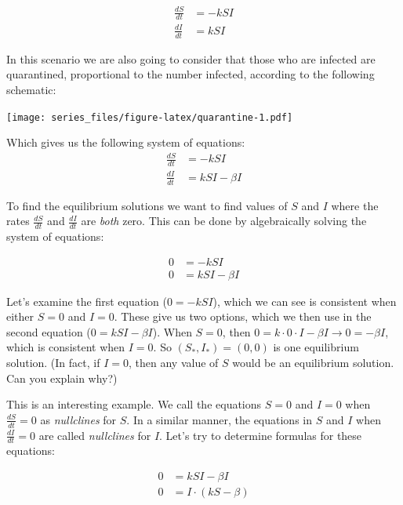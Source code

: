 \documentclass[
]{book}
\theoremstyle{definition}
\theoremstyle{definition}
\theoremstyle{definition}
\theoremstyle{remark}
\begin{document}
\begin{align*}
\frac{dS}{dt} &= -kSI \\
\frac{dI}{dt} &= kSI
\end{align*}

In this scenario we are also going to consider that those who are infected are quarantined, proportional to the number infected, according to the following schematic:

\texttt{[image: series\_files/figure-latex/quarantine-1.pdf]}

Which gives us the following system of equations:
\begin{equation}
\begin{split}\label{eq:flu-quarantine}
\frac{dS}{dt} &= -kSI \\
\frac{dI}{dt} &= kSI - \beta I
\end{split}
\end{equation}

To find the equilibrium solutions we want to find values of \(S\) and \(I\) where the rates \(\displaystyle \frac{dS}{dt}\) and \(\displaystyle \frac{dI}{dt}\) are \emph{both} zero. This can be done by algebraically solving the system of equations:

\begin{align*}
0 &= -kSI \\
0 &= kSI - \beta I
\end{align*}

Let's examine the first equation (\(0 = -kSI\)), which we can see is consistent when either \(S=0\) and \(I=0\). These give us two options, which we then use in the second equation (\(0 = kSI - \beta I\)). When \(S=0\), then \(0 = k\cdot 0 \cdot I - \beta I \rightarrow 0 = -\beta I\), which is consistent when \(I=0\). So \((S_{*},I_{*}) = (0,0)\) is one equilibrium solution. (In fact, if \(I=0\), then any value of \(S\) would be an equilibrium solution. Can you explain why?)

This is an interesting example. We call the equations \(S=0\) and \(I=0\) when \(\displaystyle \frac{dS}{dt}=0\) as \emph{nullclines} for \(S\). In a similar manner, the equations in \(S\) and \(I\) when \(\displaystyle \frac{dI}{dt}=0\) are called \emph{nullclines} for \(I\). Let's try to determine formulas for these equations:

\begin{align*}
0 &= kSI-\beta I \\
0 &= I\cdot (kS - \beta )
\end{align*}
\end{document}

